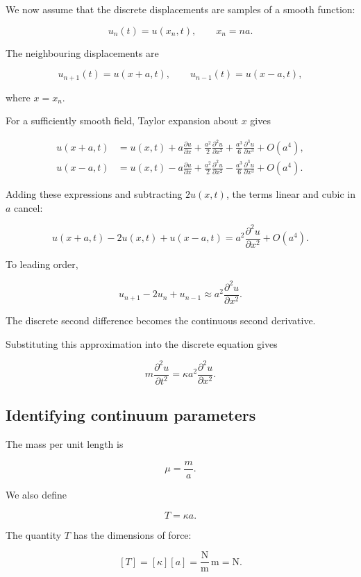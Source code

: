 We now assume that the discrete displacements are samples of a smooth function:

\[
u_{n}(t)=u(x_{n},t),
\qquad x_{n}=na.
\]

The neighbouring displacements are

\[
u_{n+1}(t)=u(x+a,t),
\qquad
u_{n-1}(t)=u(x-a,t),
\]

where \(x=x_{n}\).

For a sufficiently smooth field, Taylor expansion about \(x\) gives

\[
\begin{aligned}
u(x+a,t)
&=
u(x,t)
+a\frac{\partial u}{\partial x}
+\frac{a^{2}}{2}
\frac{\partial^{2}u}{\partial x^{2}}
+\frac{a^{3}}{6}
\frac{\partial^{3}u}{\partial x^{3}}
+O(a^{4}),\\
u(x-a,t)
&=
u(x,t)
-a\frac{\partial u}{\partial x}
+\frac{a^{2}}{2}
\frac{\partial^{2}u}{\partial x^{2}}
-\frac{a^{3}}{6}
\frac{\partial^{3}u}{\partial x^{3}}
+O(a^{4}).
\end{aligned}
\]

Adding these expressions and subtracting \(2u(x,t)\), the terms linear and cubic in \(a\) cancel:

\[
u(x+a,t)-2u(x,t)+u(x-a,t)
=
a^{2}
\frac{\partial^{2}u}{\partial x^{2}}
+O(a^{4}).
\]

To leading order,

\[
u_{n+1}-2u_{n}+u_{n-1}
\approx
a^{2}
\frac{\partial^{2}u}{\partial x^{2}}.
\]

The discrete second difference becomes the continuous second derivative.

Substituting this approximation into the discrete equation gives

\[
m
\frac{\partial^{2}u}{\partial t^{2}}
=
\kappa a^{2}
\frac{\partial^{2}u}{\partial x^{2}}.
\]

\subsection{Identifying continuum parameters}

The mass per unit length is

\[
\mu=\frac{m}{a}.
\]

We also define

\[
T=\kappa a.
\]

The quantity \(T\) has the dimensions of force:

\[
[T]
=
[\kappa][a]
=
\frac{\mathrm{N}}{\mathrm{m}}\,\mathrm{m}
=
\mathrm{N}.
\]

